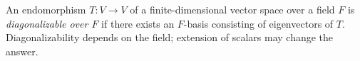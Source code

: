 
An endomorphism $T:V\to V$ of a finite-dimensional vector space over a field $F$ is \emph{diagonalizable over $F$} if there exists an $F$-basis consisting of eigenvectors of $T$. Diagonalizability depends on the field; extension of scalars may change the answer.
